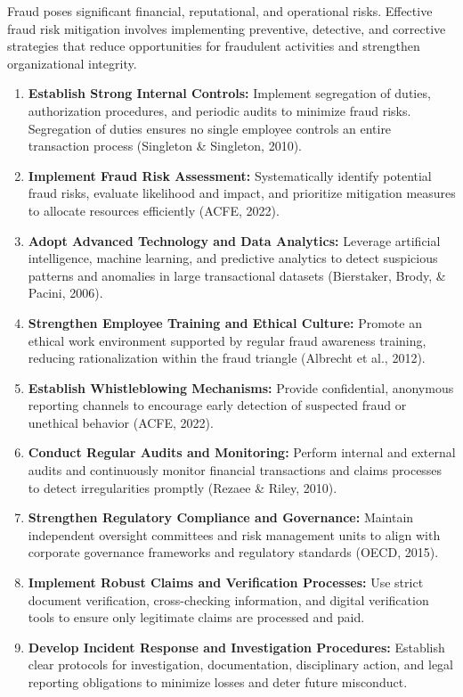 \documentclass[12pt,a4paper]{article}
\begin{document}
Fraud poses significant financial, reputational, and operational risks. Effective fraud risk mitigation involves implementing preventive, detective, and corrective strategies that reduce opportunities for fraudulent activities and strengthen organizational integrity.

\begin{enumerate}
    \item \textbf{Establish Strong Internal Controls:} Implement segregation of duties, authorization procedures, and periodic audits to minimize fraud risks. Segregation of duties ensures no single employee controls an entire transaction process (Singleton \& Singleton, 2010).
    \item \textbf{Implement Fraud Risk Assessment:} Systematically identify potential fraud risks, evaluate likelihood and impact, and prioritize mitigation measures to allocate resources efficiently (ACFE, 2022).
    \item \textbf{Adopt Advanced Technology and Data Analytics:} Leverage artificial intelligence, machine learning, and predictive analytics to detect suspicious patterns and anomalies in large transactional datasets (Bierstaker, Brody, \& Pacini, 2006).
    \item \textbf{Strengthen Employee Training and Ethical Culture:} Promote an ethical work environment supported by regular fraud awareness training, reducing rationalization within the fraud triangle (Albrecht et al., 2012).
    \item \textbf{Establish Whistleblowing Mechanisms:} Provide confidential, anonymous reporting channels to encourage early detection of suspected fraud or unethical behavior (ACFE, 2022).
    \item \textbf{Conduct Regular Audits and Monitoring:} Perform internal and external audits and continuously monitor financial transactions and claims processes to detect irregularities promptly (Rezaee \& Riley, 2010).
    \item \textbf{Strengthen Regulatory Compliance and Governance:} Maintain independent oversight committees and risk management units to align with corporate governance frameworks and regulatory standards (OECD, 2015).
    \item \textbf{Implement Robust Claims and Verification Processes:} Use strict document verification, cross-checking information, and digital verification tools to ensure only legitimate claims are processed and paid.
    \item \textbf{Develop Incident Response and Investigation Procedures:} Establish clear protocols for investigation, documentation, disciplinary action, and legal reporting obligations to minimize losses and deter future misconduct.
\end{enumerate}
\end{document}
